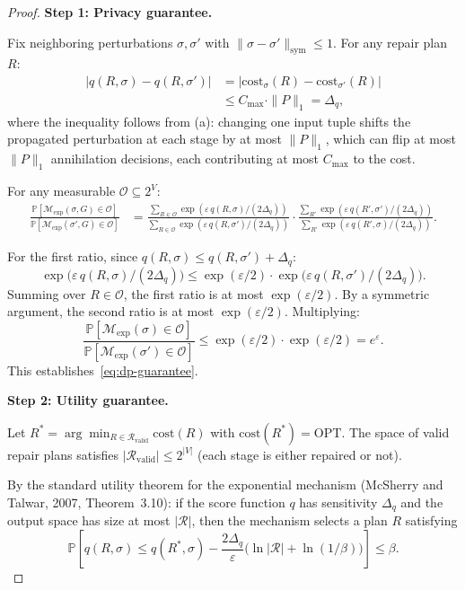 \documentclass[11pt,a4paper]{article}
\theoremstyle{definition}
\newcommand{\cost}{\mathrm{cost}}
\newcommand{\OPT}{\mathrm{OPT}}
\newcommand{\bbP}{\mathbb{P}}
\newcommand{\cR}{\mathcal{R}}
\begin{document}
\begin{proof}
\textbf{Step 1: Privacy guarantee.}

Fix neighboring perturbations $\sigma, \sigma'$ with
$\|\sigma - \sigma'\|_{\mathrm{sym}} \leq 1$.  For any repair plan~$R$:
\begin{align*}
  |q(R, \sigma) - q(R, \sigma')|
  &= |\cost_\sigma(R) - \cost_{\sigma'}(R)| \\
  &\leq C_{\max} \cdot \|P\|_1 = \Delta_q,
\end{align*}
where the inequality follows from (a):
changing one input tuple shifts the propagated perturbation at each stage
by at most $\|P\|_1$, which can flip at most $\|P\|_1$ annihilation
decisions, each contributing at most $C_{\max}$ to the cost.

For any measurable $\mathcal{O} \subseteq 2^V$:
\begin{align*}
  \frac{\bbP[\mathcal{M}_{\mathrm{exp}}(\sigma, G) \in \mathcal{O}]}
       {\bbP[\mathcal{M}_{\mathrm{exp}}(\sigma', G) \in \mathcal{O}]}
  &= \frac{\sum_{R \in \mathcal{O}} \exp(\varepsilon\, q(R, \sigma) / (2\Delta_q))}
          {\sum_{R \in \mathcal{O}} \exp(\varepsilon\, q(R, \sigma') / (2\Delta_q))}
    \cdot
    \frac{\sum_{R'} \exp(\varepsilon\, q(R', \sigma') / (2\Delta_q))}
         {\sum_{R'} \exp(\varepsilon\, q(R', \sigma) / (2\Delta_q))}.
\end{align*}

For the first ratio, since $q(R, \sigma) \leq q(R, \sigma') + \Delta_q$:
\[
  \exp\!\bigl(\varepsilon\, q(R, \sigma) / (2\Delta_q)\bigr)
  \leq \exp(\varepsilon/2) \cdot
    \exp\!\bigl(\varepsilon\, q(R, \sigma') / (2\Delta_q)\bigr).
\]
Summing over $R \in \mathcal{O}$, the first ratio is at most
$\exp(\varepsilon/2)$.  By a symmetric argument, the second ratio is
at most $\exp(\varepsilon/2)$.  Multiplying:
\[
  \frac{\bbP[\mathcal{M}_{\mathrm{exp}}(\sigma) \in \mathcal{O}]}
       {\bbP[\mathcal{M}_{\mathrm{exp}}(\sigma') \in \mathcal{O}]}
  \leq \exp(\varepsilon/2) \cdot \exp(\varepsilon/2) = e^{\varepsilon}.
\]
This establishes~\eqref{eq:dp-guarantee}.

\textbf{Step 2: Utility guarantee.}

Let $R^* = \arg\min_{R \in \cR_{\mathrm{valid}}} \cost(R)$ with
$\cost(R^*) = \OPT$.
The space of valid repair plans satisfies $|\cR_{\mathrm{valid}}| \leq 2^{|V|}$
(each stage is either repaired or not).

By the standard utility theorem for the exponential mechanism (McSherry and
Talwar, 2007, Theorem~3.10): if the score function $q$ has sensitivity
$\Delta_q$ and the output space has size at most $|\cR|$, then the mechanism
selects a plan $R$ satisfying
\[
  \bbP\!\left[q(R, \sigma) \leq q(R^*, \sigma)
    - \frac{2\Delta_q}{\varepsilon}\bigl(\ln|\cR| + \ln(1/\beta)\bigr)\right]
  \leq \beta.
\]


\end{proof}
\end{document}
